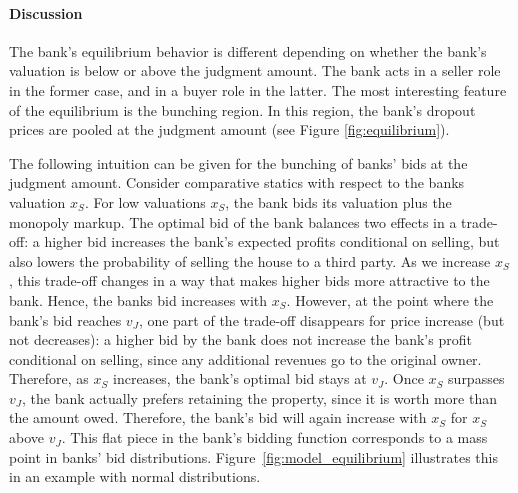 \documentclass[11pt,twopage]{article}
\begin{document}
\paragraph{Discussion} The bank's equilibrium
behavior is different depending on whether the bank's valuation is
below or above the judgment amount. The bank acts in a seller role in
the former case, and in a buyer role in the latter. The most
interesting feature of the equilibrium is the bunching region. In this region, the bank's dropout prices are pooled
at the judgment amount (see Figure \ref{fig:equilibrium}).

The following intuition can be given for the bunching of banks' bids at the judgment amount. Consider comparative statics with respect to the banks valuation $x_S$. For low valuations $x_S$, the bank bids its valuation plus the monopoly markup. The optimal bid of the bank balances two effects in a trade-off: a higher bid increases the bank's expected profits conditional on selling, but also lowers the probability of selling the house to a third party. As we increase $x_S$, this trade-off changes in a way that makes higher bids more attractive to the bank. Hence, the banks bid increases with $x_S$. However, at the point where the bank's bid reaches $v_J$, one part of the trade-off disappears for price increase (but not decreases): a higher bid by the bank does not increase the bank's profit conditional on selling, since any additional revenues go to the original owner. Therefore, as $x_S$ increases, the bank's optimal bid stays at $v_J$. Once $x_S$ surpasses $v_J$, the bank actually prefers retaining the property, since it is worth more than the amount owed. Therefore, the bank's bid will again increase with $x_S$ for $x_S$ above $v_J$.
%
This flat piece in the bank's bidding function corresponds to a mass point in banks' bid distributions.
Figure~\ref{fig:model_equilibrium} illustrates this in an
example with normal distributions.
\end{document}
